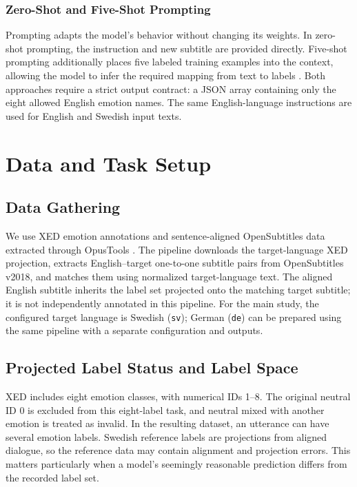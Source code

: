 \documentclass[11pt,a4paper]{article}
\begin{document}
\subsubsection{Zero-Shot and Five-Shot Prompting}
Prompting adapts the model's behavior without changing its weights. In zero-shot prompting, the instruction and new subtitle are provided directly. Five-shot prompting additionally places five labeled training examples into the context, allowing the model to infer the required mapping from text to labels \cite{brown2020language}. Both approaches require a strict output contract: a JSON array containing only the eight allowed English emotion names. The same English-language instructions are used for English and Swedish input texts.

\section{Data and Task Setup}
\subsection{Data Gathering}
We use XED emotion annotations and sentence-aligned OpenSubtitles data extracted through OpusTools \cite{aulamo2020opus}. The pipeline downloads the target-language XED projection, extracts English--target one-to-one subtitle pairs from OpenSubtitles v2018, and matches them using normalized target-language text. The aligned English subtitle inherits the label set projected onto the matching target subtitle; it is not independently annotated in this pipeline. For the main study, the configured target language is Swedish (\texttt{sv}); German (\texttt{de}) can be prepared using the same pipeline with a separate configuration and outputs.

\subsection{Projected Label Status and Label Space}
XED includes eight emotion classes, with numerical IDs 1--8. The original neutral ID 0 is excluded from this eight-label task, and neutral mixed with another emotion is treated as invalid. In the resulting dataset, an utterance can have several emotion labels. Swedish reference labels are projections from aligned dialogue, so the reference data may contain alignment and projection errors. This matters particularly when a model's seemingly reasonable prediction differs from the recorded label set.
\end{document}
